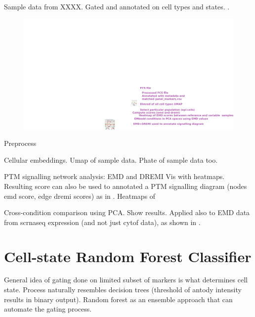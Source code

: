 Sample data from XXXX. Gated and annotated on cell types and states. \cite{sufi_multiplexed_2021}.



\begin{figure}
    \centering
    \includegraphics{03cygnal/figs/3CYGNAL_usage.png}
    \caption{}
    \label{}
\end{figure}

Preprocess

Cellular embeddings.
Umap of sample data. Phate of sample data too.

PTM signalling network analysis: EMD and DREMI
Vis with heatmaps. Resulting score can also be used to annotated a PTM signalling diagram (nodes emd score, edge dremi scores) as in \cite{qin_cell-type-specific_2020}.
Heatmaps of 

Cross-condition comparison using PCA. 
Show results. Applied also to EMD data from scrnaseq expression (and not just cytof data), as shown in \cite{cardoso_rodriguez_single-cell_2023}.


\section{Cell-state Random Forest Classifier}

General idea of gating done on limited subset of markers is what determines cell state. Process naturally resembles decision trees (threshold of antody intensity results in binary output). Random forest as an ensemble approach that can automate the gating process.

